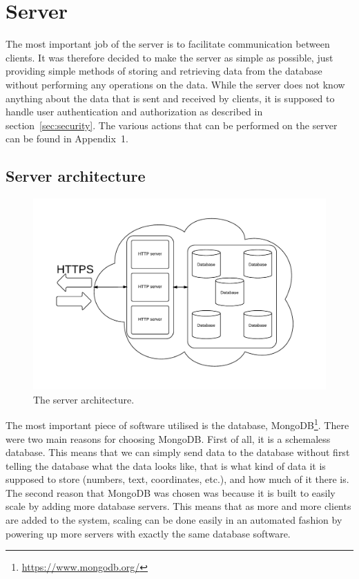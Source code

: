 \section{Server}
The most important job of the server is to facilitate communication between clients.
It was therefore decided to make the server as simple as possible, just providing simple methods of storing and retrieving data from the database without performing any operations on the data.
While the server does not know anything about the data that is sent and received by clients, it is supposed to handle user authentication and authorization as described in section~\ref{sec:security}.
The various actions that can be performed on the server can be found in Appendix~1.

\subsection{Server architecture}
\begin{figure}[H]
\begin{center}
	\includegraphics[scale=0.75]{graphics/server.pdf}
	\caption{The server architecture.}
	\label{fig:server-architecture}
\end{center}
\end{figure}
The most important piece of software utilised is the database, MongoDB\footnote{\url{https://www.mongodb.org/}}.
There were two main reasons for choosing MongoDB.
First of all, it is a schemaless database.
This means that we can simply send data to the database without first telling the database what the data looks like, that is what kind of data it is supposed to store (numbers, text, coordinates, etc.), and how much of it there is.
The second reason that MongoDB was chosen was because it is built to easily scale by adding more database servers.
This means that as more and more clients are added to the system, scaling can be done easily in an automated fashion by powering up more servers with exactly the same database software.

